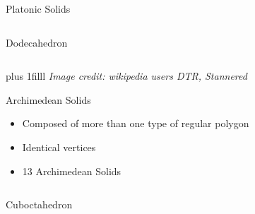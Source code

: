 \documentclass{beamer}
\newcommand{\btVFill}{\vskip0pt plus 1filll}
\begin{document}
\begin{frame}{Platonic Solids}
\begin{columns}
\begin{column}{0.32\textwidth}
      Dodecahedron
     \end{column}
\end{columns}
\btVFill
\textit{\scriptsize Image credit: wikipedia users DTR, Stannered}
\end{frame}
\begin{frame}{Archimedean Solids}
\begin{itemize}
  \item Composed of more than one type of regular polygon
  \item Identical vertices
  \item 13 Archimedean Solids
\end{itemize}
\vspace{0.1 in}
\begin{columns}
    \begin{column}{0.32\textwidth}
      \centering
      

      Cuboctahedron
     \end{column}
    \begin{column}{0.32\textwidth}
      \centering


\end{column}
\end{columns}
\end{frame}
\end{document}
